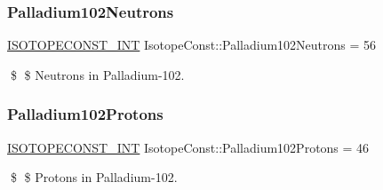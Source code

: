 \subsubsection{\texorpdfstring{Palladium102\+Neutrons}{Palladium102Neutrons}}
{\footnotesize\ttfamily \mbox{\hyperlink{group___isotope_const-_macros_ga5f18360b3e99483a35c32d789e62621c}{I\+S\+O\+T\+O\+P\+E\+C\+O\+N\+S\+T\+\_\+\+I\+NT}} Isotope\+Const\+::\+Palladium102\+Neutrons = 56}

\$ \$ Neutrons in Palladium-\/102. \mbox{\label{group___isotope_const-_palladium-_pd102_ga6b74518f0da183b7e7fcd3acf6eb927e}} 
\subsubsection{\texorpdfstring{Palladium102\+Protons}{Palladium102Protons}}
{\footnotesize\ttfamily \mbox{\hyperlink{group___isotope_const-_macros_ga5f18360b3e99483a35c32d789e62621c}{I\+S\+O\+T\+O\+P\+E\+C\+O\+N\+S\+T\+\_\+\+I\+NT}} Isotope\+Const\+::\+Palladium102\+Protons = 46}

\$ \$ Protons in Palladium-\/102. 